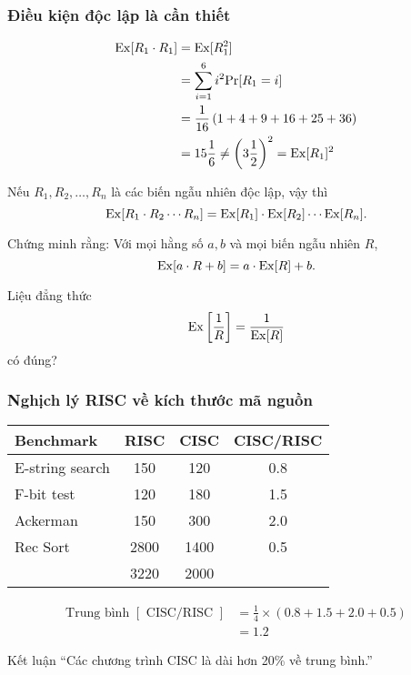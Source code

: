 \begin{frame}
  \frametitle{Điều kiện độc lập là cần thiết }
  \begin{xmpl}
    \begin{align*}
      \mathrm{Ex}[R_1\cdot R_1] &= \mathrm{Ex}[R_1^2] \\
                        &=\sum_{i=1}^{6} i^2 \mathrm{Pr}[R_1 = i] \\
                        &= \frac{1}{16}\left( 1+4+9+ 16 + 25 + 36
                          \right)\\
                        &= 15\frac{1}{6} \not=
                          \left(3\frac{1}{2}\right)^2 = \mathrm{Ex}[R_1]^2
    \end{align*}
  \end{xmpl}
\end{frame}

\begin{frame}
  \begin{crllr}
    Nếu $R_1, R_2, \dots, R_n$ là các biến ngẫu nhiên độc lập, vậy thì 
    $$
    \mathrm{Ex}[R_1 \cdot R_2  \cdots R_n] = \mathrm{Ex}[R_1]\cdot \mathrm{Ex}[R_2] \cdots \mathrm{Ex}[R_n].
    $$
  \end{crllr}
\end{frame}

\begin{frame}
  Chứng minh rằng: Với mọi hằng số $a,b$ và mọi biến ngẫu nhiên $R$, 
  $$
  \mathrm{Ex}[a\cdot R  + b] = a \cdot  \mathrm{Ex}[R] + b.
  $$ 
\end{frame} 

\begin{frame}
  \begin{qstn}
    Liệu đẳng thức  $$\mathrm{Ex}\left[\frac{1}{R}\right] = \frac{1}{\mathrm{Ex}[R]}$$ có đúng?
  \end{qstn}
\end{frame}

\begin{frame}
  \frametitle{Nghịch lý RISC về   kích thước mã nguồn}
  \begin{center}
    \begin{tabular}{lccc}
      Benchmark& RISC &CISC &CISC/RISC \\
      \hline 
      E-string search  &150 &120 &0.8 \\
      F-bit test       &120 &180 &1.5\\
      Ackerman         &150 &300 &2.0\\
      Rec Sort         &2800 &1400 &0.5 \\
\hline
                       &3220 &2000 
 
    \end{tabular}
  \end{center}
    \begin{align*}
      \text{Trung bình }[\text{ CISC/RISC }]&=\frac{1}{4} \times \left(  0.8 +
                                 1.5 +   2.0 +   0.5 \right)\\
      &= 1.2
    \end{align*}

  \begin{block}{Kết luận}
    ``Các chương trình CISC là dài hơn 20\% về trung bình.'' 
  \end{block}
\end{frame}

